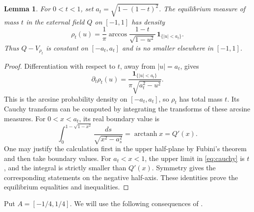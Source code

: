 \documentclass[11pt]{article}
\newtheorem{lemma}[theorem]{Lemma}
\theoremstyle{definition}
\numberwithin{equation}{section}
\DeclareMathOperator{\arctanh}{arctanh}
\newcommand{\one}{\mathbf 1}
\begin{document}
\begin{lemma}\label{lem:equilibrium}
For \(0<t<1\), set \(a_t=\sqrt{1-(1-t)^2}\).
The equilibrium measure of mass \(t\) in the external field \(Q\)
on \([-1,1]\) has density
\begin{equation}\label{eq:density}
 \rho_t(u)=\frac1\pi
 \arccos\frac{1-t}{\sqrt{1-u^2}}\,
 \one_{\{|u|<a_t\}}.
\end{equation}
Thus \(Q-V_{\rho_t}\) is constant on \([-a_t,a_t]\) and is no smaller
elsewhere in \([-1,1]\).
\end{lemma}

\begin{proof}
Differentiation with respect to \(t\), away from \(|u|=a_t\), gives
\begin{equation}\label{eq:density-derivative}
 \partial_t\rho_t(u)=
 \frac{\one_{\{|u|<a_t\}}}{\pi\sqrt{a_t^2-u^2}}.
\end{equation}
This is the arcsine probability density on \([-a_t,a_t]\), so
\(\rho_t\) has total mass \(t\).
Its Cauchy transform can be computed by integrating the transforms
of these arcsine measures. For \(0<x<a_t\), its real boundary value is
\begin{equation}\label{eq:cauchy}
 \int_0^{1-\sqrt{1-x^2}}\frac{ds}{\sqrt{x^2-a_s^2}}
 =\arctanh x=Q'(x).
\end{equation}
One may justify the calculation first in the upper half-plane by
Fubini's theorem and then take boundary values.
For \(a_t<x<1\), the upper limit in \eqref{eq:cauchy} is \(t\),
and the integral is strictly smaller than \(Q'(x)\).
Symmetry gives the corresponding statements on the negative
half-axis. These identities prove the equilibrium equalities and
inequalities.
\end{proof}

Put \(A=[-1/4,1/4]\). We will use the following consequences of
\cite{KSSV}.
\end{document}
